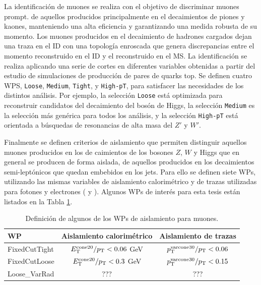 La identificación de muones se realiza con el objetivo de discriminar muones prompt. de aquellos producidos principalmente en el decaimientos de piones y kaones, manteniendo una alta eficiencia y garantizando una medida robusta de su momento. Los muones producidos en el decaimiento de hadrones cargados dejan una traza en el ID con una topología enroscada 
que genera discrepancias entre el momento reconstruido en el ID y el reconstruido en el MS. La identificación se realiza aplicando una serie de cortes en diferentes variables \cite{PERF-2015-10} obtenidas a partir del estudio de simulaciones de producción de pares de quarks top. Se definen cuatro WPS, \texttt{Loose}, \texttt{Medium}, \texttt{Tight}, y \texttt{High-pT}, para satisfacer las necesidades de los distintos análisis. Por ejemplo, la selección \texttt{Loose} está optimizada para reconstruir candidatos del decaimiento del bosón de Higgs, la selección \texttt{Medium} es la selección más genérica para todos los análisis, y la selección \texttt{High-pT} está orientada a búsquedas de resonancias de alta masa del $Z'$ y $W'$. 

Finalmente se definen criterios de aislamiento que permiten distinguir aquellos muones producidos en los de caimientos de los bosones $Z$, $W$ y Higgs que en general se producen de forma aislada, de aquellos producidos en los decaimientos semi-leptónicos que quedan embebidos en los jets. Para ello se definen siete WPs, utilizando las mismas variables de aislamiento calorimétrico y de trazas utilizadas para fotones y electrones ( y ). Algunos WPs de interés para esta tesis están listados en la Tabla \ref{tab:muon_WPs}.

\begin{table} 
\centering
\caption{Definición de algunos de los WPs de aislamiento para muones. }
  \begin{tabular}{ l c c}

    WP & Aislamiento calorimétrico & Aislamiento de trazas \\

    \hline
    \hline

    FixedCutTight & $E_{\text{T}}^{\text{cone20}}/p_{\text{T}} < 0.06$ GeV & $p_{\text{T}}^{\text{varcone30}}/p_{\text{T}}<0.06$ \\

    FixedCutLoose & $E_{\text{T}}^{\text{cone20}}/p_{\text{T}} < 0.3$ GeV  & $p_{\text{T}}^{\text{varcone30}}/p_{\text{T}}<0.15$ \\

    \hline

    Loose\_VarRad & ??? & ??? \\

  \end{tabular}
\label{tab:muon_WPs}
\end{table}


